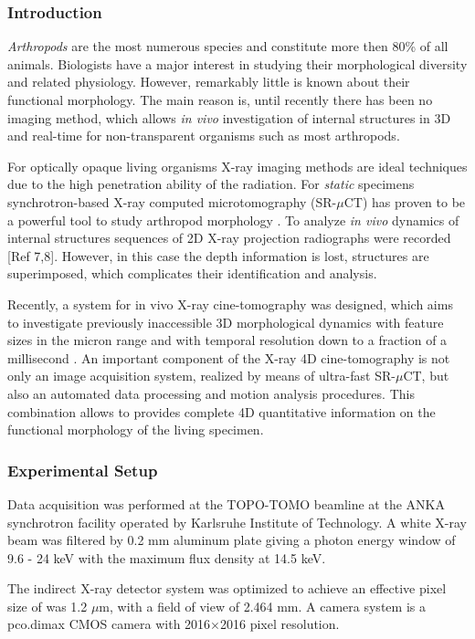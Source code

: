 \subsubsection{Introduction}

\textit{Arthropods} are the most numerous species and constitute more then 80\% of all animals. Biologists have a major interest in studying their morphological diversity and related physiology. However, remarkably little is known about their functional morphology. The main reason is, until recently there has been no imaging method, which allows \textit{in vivo} investigation of internal structures in 3D and real-time for non-transparent organisms such as most arthropods.  

For optically opaque living organisms X-ray imaging methods are ideal techniques due to the high penetration ability of the radiation. For \textit{static} specimens synchrotron-based X-ray computed microtomography (SR-$\mu$CT) has proven to be a powerful tool to study arthropod morphology \cite{Westneat08}. To analyze \textit{in vivo} dynamics of internal structures sequences of 2D X-ray projection radiographs were recorded [Ref 7,8]. However, in this case the depth information is lost, structures are superimposed, which complicates their identification and analysis.  

Recently, a system for in vivo X-ray cine-tomography was designed, which aims to  investigate previously inaccessible 3D morphological dynamics with feature sizes in the micron range and with temporal resolution down to a fraction of a millisecond \cite{dosSantosRolo14}.  An important component of the X-ray 4D cine-tomography is not only an image acquisition system, realized by means of ultra-fast SR-$\mu$CT, but also an automated data processing and motion analysis procedures. This combination allows to provides complete 4D quantitative information on the functional morphology of the living specimen.


\subsubsection{Experimental Setup}

Data acquisition was performed at the TOPO-TOMO
beamline at the ANKA synchrotron facility operated by Karlsruhe Institute of Technology. A white X-ray beam was filtered by 0.2 mm aluminum plate giving a photon energy window of 9.6 - 24 keV with the maximum flux density at 14.5 keV.

The indirect X-ray detector system was optimized to achieve an effective pixel size of was 1.2 $\mu$m, with a field of view of 2.464 mm. A camera system is a pco.dimax CMOS camera with 2016$\times$2016 pixel resolution.



